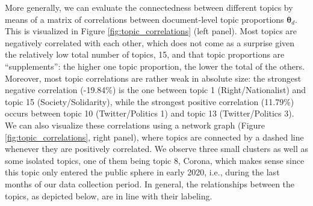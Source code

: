More generally, we can evaluate the connectedness between different topics by means of a matrix of correlations between document-level topic proportions $\boldsymbol{\theta}_d$. This is visualized in Figure \ref{fig:topic_correlations} (left panel). Most topics are negatively correlated with each other, which does not come as a surprise given the relatively low total number of topics, 15, and that topic proportions are “supplements”: the higher one topic proportion, the lower the total of the others. Moreover, most topic correlations are rather weak in absolute size: the strongest negative correlation (-19.84\%) is the one between topic 1 (Right/Nationalist) and topic 15 (Society/Solidarity), while the strongest positive correlation (11.79\%) occurs between topic 10 (Twitter/Politics 1) and topic 13 (Twitter/Politics 3). We can also visualize these correlations using a network graph (Figure \ref{fig:topic_correlations}, right panel), where topics are connected by a dashed line whenever they are positively correlated. We observe three small clusters as well as some isolated topics, one of them being topic 8, Corona, which makes sense since this topic only entered the public sphere in early 2020, i.e., during the last months of our data collection period. In general, the relationships between the topics, as depicted below, are in line with their labeling.

